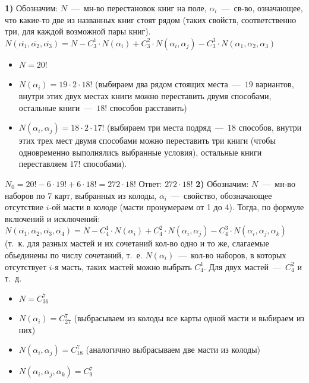 \documentclass[12pt,a4paper,fleqn]{article}
\begin{document}
{\bf 1)} Обозначим: $N$~---~мн-во перестановок книг на поле, $\alpha_i$~---~св-во, означающее, что какие-то две из названных книг стоят рядом (таких свойств, соответственно три, для каждой возможной пары книг). \newline
$N(\overline{\alpha_1}, \overline{\alpha_2}, \overline{\alpha_3}) = N - C_3^1 \cdot N(\alpha_i) + C_3^2 \cdot N(\alpha_i, \alpha_j) - C_3^3 \cdot N(\alpha_1, \alpha_2, \alpha_3)$ \newline
\begin{itemize}
\item $N = 20!$ 
\item $N(\alpha_i) = 19 \cdot 2 \cdot 18!$ (выбираем два рядом стоящих места~---~$19$ вариантов, внутри этих двух местах книги можно переставить двумя способами, остальные книги~---~$18!$ способов расставить)
\item $N(\alpha_i, \alpha_j) = 18 \cdot 2 \cdot 17!$ (выбираем три места подряд~---~$18$ способов, внутри этих трех мест двумя способами можно переставить три книги (чтобы одновременно выполнялись выбранные условия), остальные книги переставляем $17!$ способами).
\end{itemize}
$N_0 = 20! - 6 \cdot 19! + 6 \cdot 18! = 272 \cdot 18!$ \newline
Ответ: $272 \cdot 18!$ \newline \newline
{\bf 2)} Обозначим: $N$~---~мн-во наборов по 7 карт, выбранных из колоды, $\alpha_i$~---~свойство, обозначающее отсутствие $i$-ой масти в колоде (масти пронумераем от 1 до 4). Тогда, по формуле включений и исключений: \newline
$N(\overline{\alpha_1},\overline{\alpha_2},\overline{\alpha_3},\overline{\alpha_4}) = N - C_4^1 \cdot N(\alpha_i) + C_4^2 \cdot N(\alpha_i, \alpha_j) - C_4^3 \cdot N(\alpha_i, \alpha_j,\alpha_k)$ (т.~к. для разных мастей и их сочетаний кол-во одно и то же, слагаемые обьединены по числу сочетаний, т.~е. $N(\alpha_i)$~---~кол-во наборов, в которых отсутствует $i$-я масть, таких мастей можно выбрать $C_4^1$. Для двух мастей~---~$C_4^2$ и т.~д. \newline
\begin{itemize}
\item $N = C_{36}^7$
\item $N(\alpha_i) = C_{27}^7$ (выбрасываем из колоды все карты одной масти и выбираем из них)
\item $N(\alpha_i, \alpha_j) = C_{18}^7$ (аналогично выбрасываем две масти из колоды)
\item $N(\alpha_i, \alpha_j, \alpha_k) = C_9^7$
\end{itemize}
\end{document}

